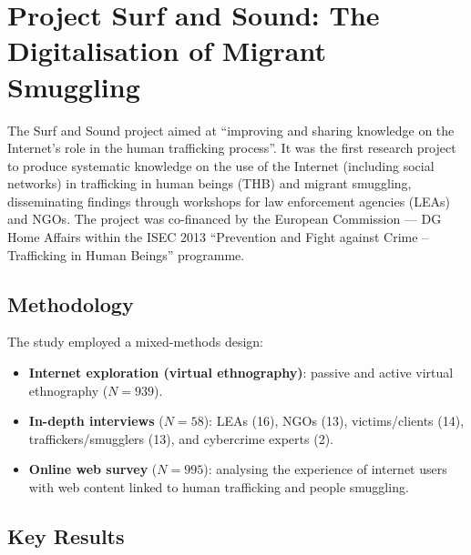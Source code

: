 \documentclass[11pt,a4paper,openany]{report}
\theoremstyle{definition}
\theoremstyle{plain}
\theoremstyle{remark}
\begin{document}
\section{Project Surf and Sound: The Digitalisation of Migrant Smuggling}

The Surf and Sound project aimed at ``improving and sharing knowledge on the Internet's role in the human trafficking process''. It was the first research project to produce systematic knowledge on the use of the Internet (including social networks) in trafficking in human beings (THB) and migrant smuggling, disseminating findings through workshops for law enforcement agencies (LEAs) and NGOs. The project was co-financed by the European Commission --- DG Home Affairs within the ISEC 2013 ``Prevention and Fight against Crime -- Trafficking in Human Beings'' programme.

\subsection{Methodology}

The study employed a mixed-methods design:

\begin{itemize}
    \item \textbf{Internet exploration (virtual ethnography)}: passive and active virtual ethnography ($N = 939$).
    \item \textbf{In-depth interviews} ($N = 58$): LEAs (16), NGOs (13), victims/clients (14), traffickers/smugglers (13), and cybercrime experts (2).
    \item \textbf{Online web survey} ($N = 995$): analysing the experience of internet users with web content linked to human trafficking and people smuggling.
\end{itemize}

\subsection{Key Results}
\end{document}
